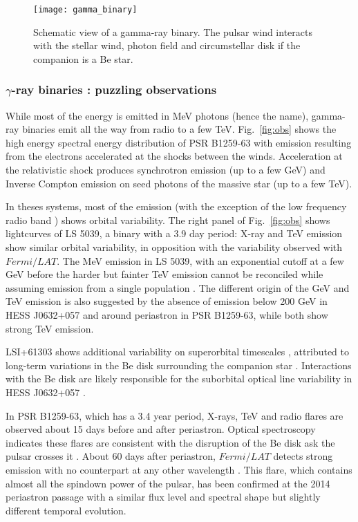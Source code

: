 \begin{figure}[h]  
\centering
  \texttt{[image: gamma\_binary]}
\caption{Schematic view of a gamma-ray binary. The pulsar wind interacts with the stellar wind,  photon field and circumstellar disk if the companion is a Be star.}
\label{fig:gamma_binary}
\end{figure}




\subsubsection {$\gamma$-ray binaries : puzzling observations}
While most of the energy is emitted in MeV photons (hence the name), gamma-ray binaries emit all the way from radio to a few TeV. Fig.~\ref{fig:obs} shows the high energy spectral energy distribution of PSR B1259-63 with emission resulting from the electrons accelerated at the shocks between the winds. Acceleration at the relativistic shock produces synchrotron emission (up to a few GeV) and Inverse Compton emission on seed photons of the massive star (up to a few TeV).   


In theses systems, most of the emission (with the exception of the low frequency radio band \citep{2015MNRAS.451...59M}) shows orbital variability. The right panel of  Fig.~\ref{fig:obs} shows lightcurves of LS 5039, a binary with a 3.9 day period:  X-ray and TeV emission show similar orbital variability, in opposition with the variability observed with $Fermi/LAT$.  The MeV emission in LS 5039, with an exponential cutoff at a few GeV before the harder but fainter TeV emission cannot be reconciled while assuming emission from a single population \citep{2008A&A...477..691D}. The different origin of the GeV and TeV emission is also suggested by the absence of emission below 200 GeV  in HESS J0632+057  \citep{2016arXiv160108216M} and around periastron in PSR B1259-63, while both show strong TeV emission.  

 LSI+61303 shows additional variability on superorbital timescales \citep{2012ApJ...747L..29C}, attributed to long-term variations in the Be disk surrounding the companion star \citep{2015A&A...575L...6P}. Interactions with the Be disk are likely responsible for the suborbital optical line variability in HESS J0632+057 \citep{2015ApJ...804L..32M}. 

In PSR B1259-63, which has a 3.4 year period, X-rays, TeV and radio flares are observed about 15 days before and after periastron. Optical spectroscopy indicates these flares are consistent with the disruption of the Be disk ask the pulsar crosses it \citep{2016MNRAS.455.3674V}.  About 60 days after periastron, $Fermi/LAT$ detects strong emission with no counterpart at any other wavelength \citep{2011ApJ...736L..11A}.  This flare, which contains almost all the spindown power of the pulsar,  has been confirmed at the 2014 periastron passage \citep{2015ApJ...811...68C} with a similar flux level and spectral shape but slightly different temporal evolution.  


